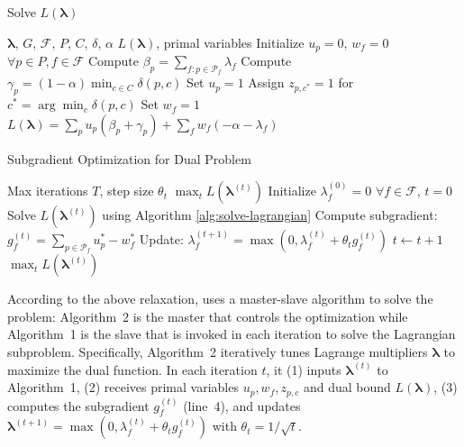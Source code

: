 \begin{algorithm}[t]
\caption{Solve \( L(\boldsymbol{\lambda}) \)}
\label{alg:solve-lagrangian}
\begin{algorithmic}[1]
\footnotesize
\Require \(\boldsymbol{\lambda}\), \(G\), \(\mathcal{F}\), \(P\), \(C\), \(\delta\), \(\alpha\)
\Ensure \(L(\boldsymbol{\lambda})\), primal variables
\State Initialize \(u_p = 0\), \(w_f = 0\) \(\forall p \in P, f \in \mathcal{F}\)
  \State Compute \(\beta_p = \sum_{f: p \in \mathcal{P}_f} \lambda_f\) 
  \State Compute \(\gamma_p = (1-\alpha) \min_{c \in C} \delta(p, c)\) 
   
    \State Set \(u_p = 1\)
    \State Assign \(z_{p,c^*} = 1\) for \(c^* = \arg\min_c \delta(p,c)\)
  \EndIf
\EndFor
{}
   
    \State Set \(w_f = 1\) 
  \EndIf
\EndFor
\State \Return \(L(\boldsymbol{\lambda}) = \sum_p u_p (\beta_p + \gamma_p) + \sum_f w_f (-\alpha - \lambda_f)\)
\end{algorithmic}
\end{algorithm}

\begin{algorithm}[t]
\caption{Subgradient Optimization for Dual Problem}
\label{alg:subgradient}
\begin{algorithmic}[1]
\footnotesize
\Require Max iterations \(T\), step size \(\theta_t\)
\Ensure \(\max_t L(\boldsymbol{\lambda}^{(t)})\)
\State Initialize \(\lambda_f^{(0)} = 0\) \(\forall f \in \mathcal{F}\), \(t = 0\)
  \State Solve \(L(\boldsymbol{\lambda}^{(t)})\) using Algorithm \ref{alg:solve-lagrangian}
  \State Compute subgradient: \(g_f^{(t)} = \sum_{p \in \mathcal{P}_f} u_p^* - w_f^*\)
  \State Update: \(\lambda_f^{(t+1)} = \max\left(0, \lambda_f^{(t)} + \theta_t g_f^{(t)}\right)\)
  \State \(t \leftarrow t + 1\)
\EndWhile
\State \Return \(\max_t L(\boldsymbol{\lambda}^{(t)})\)
\end{algorithmic}
\end{algorithm}

According to the above relaxation, \sysname uses a master-slave algorithm to solve the problem: Algorithm~2 is the master that controls the optimization while Algorithm~1 is the slave that is invoked in each iteration to solve the Lagrangian subproblem. Specifically, Algorithm~2 iteratively tunes Lagrange multipliers $\boldsymbol{\lambda}$ to maximize the dual function. In each iteration $t$, it (1) inputs $\boldsymbol{\lambda}^{(t)}$ to Algorithm~1, (2) receives primal variables $u_p, w_f, z_{p,c}$ and dual bound $L(\boldsymbol{\lambda})$, (3) computes the subgradient $g_f^{(t)}$ (line~4), and updates $\boldsymbol{\lambda}^{(t+1)} = \max(0, \lambda_f^{(t)} + \theta_t g_f^{(t)})$ with $\theta_t = 1/\sqrt{t}$. 

